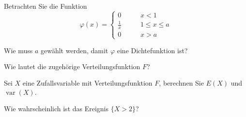 Betrachten Sie die Funktion
\[
\varphi(x)=\begin{cases}
0&\qquad x < 1\\
\frac1x&\qquad 1\le x\le a\\
0&\qquad x > a
\end{cases}
\]
\begin{teilaufgaben}
\item Wie muss $a$ gewählt werden, damit $\varphi$ eine Dichtefunktion
ist?
\item Wie lautet die zugehörige Verteilungsfunktion $F$?
\item Sei $X$ eine Zufallsvariable mit Verteilungsfunktion $F$, berechnen Sie
$E(X)$ und $\operatorname{var}(X)$.
\item Wie wahrscheinlich ist das Ereignis $\{X>2\}$?
\end{teilaufgaben}


